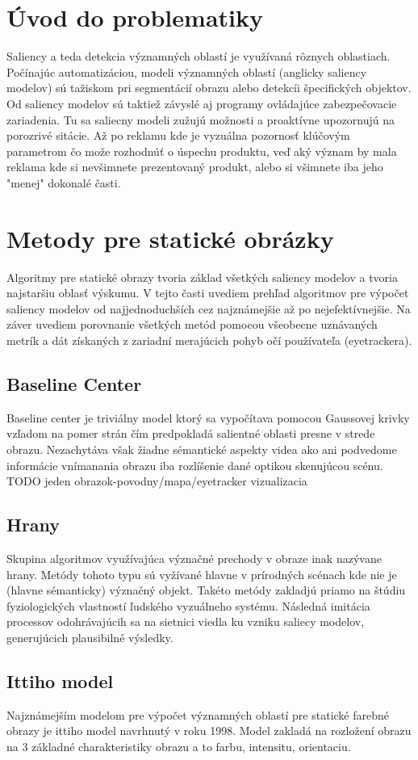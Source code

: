 \section{Úvod do problematiky}
Saliency a teda detekcia významných oblastí je využívaná rôznych oblastiach. Počínajúc automatizáciou, modeli významných oblastí (anglicky saliency modelov) sú tažiskom pri segmentácií obrazu alebo detekcíi špecifických objektov. Od saliency modelov sú taktiež závyslé aj programy ovládajúce zabezpečovacie zariadenia. Tu sa saliecny modeli zužujú možnosti a proaktívne upozornujú na porozrivé sitácie. Až po reklamu kde je vyzuálna pozornosť klúčovým parametrom čo može rozhodnúť o úspechu produktu, veď aký význam by mala reklama kde si nevšimnete prezentovaný produkt, alebo si všimnete iba jeho "menej" dokonalé časti.
\section{Metody pre statické obrázky}
Algoritmy pre statické obrazy tvoria základ všetkých saliency modelov a tvoria najstaršiu oblasť výskumu. V tejto časti uvediem prehľad algoritmov pre výpočet saliency modelov od najjednoduchších cez najznámejšie až po nejefektívnejšie. Na záver uvediem porovnanie všetkých metód pomocou všeobecne uznávaných metrík a dát získaných z zariadní merajúcich pohyb očí používateľa (eyetrackera).
\subsection{Baseline Center}\label{section:caseline-center}
Baseline center je triviálny model ktorý sa vypočítava pomocou Gaussovej krivky vzľadom na pomer strán čím predpokladá salientné oblasti presne v strede obrazu. Nezachytáva však žiadne sémantické aspekty videa ako ani podvedome informácie vnímanania obrazu iba rozlíšenie dané optikou skenujúcou scénu.
TODO jeden obrazok-povodny/mapa/eyetracker vizualizacia
\subsection{Hrany}
Skupina algoritmov využívajúca význačné prechody v obraze inak nazývane hrany. Metódy tohoto typu sú vyžívané hlavne v prírodných scénach kde nie je (hlavne sémanticky) význačný objekt. Takéto metódy zakladjú priamo na štúdiu fyziologických vlastností ľudského vyzuálneho systému. Následná imitácia processov odohrávajúcih sa na sietnici viedla ku vzniku saliecy modelov, generujúcich plausibilné výsledky\cite{edges-1}.
\subsection{Ittiho model}
Najznámejším modelom pre výpočet významných oblastí pre statické farebné obrazy je ittiho model navrhnutý v roku 1998. Model zakladá na rozložení obrazu na 3 základné charakteristiky obrazu a to farbu, intensitu, orientaciu.

